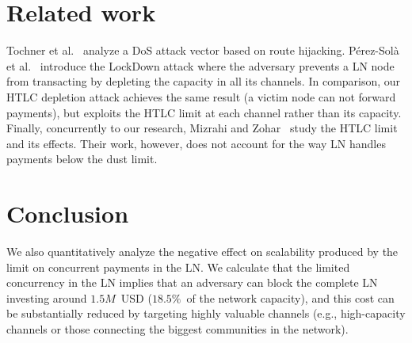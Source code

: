 \section{Related work}

Tochner et al.~\cite{Tochner2019} analyze a DoS attack vector based on route hijacking. 
P{\'{e}}rez{-}Sol{\`{a}} et al.~\cite{PerezSola2019} introduce the LockDown attack where the adversary 
prevents a LN node from transacting by depleting the capacity in all its channels.
In comparison, our HTLC depletion attack achieves the same result (a victim node can not forward payments), but exploits the HTLC limit at each channel rather than its capacity.
Finally, concurrently to our research, Mizrahi and Zohar~\cite{Mizrahi2020} study the HTLC limit and its effects.
Their work, however, does not account for the way LN handles payments below the dust limit.

\section{Conclusion}

We also quantitatively analyze the negative effect on scalability produced by the limit on concurrent payments in the LN. 
We calculate that the limited concurrency in the LN implies that an adversary can block the complete LN investing around $1.5M$~USD ($18.5\%$~of the network capacity), and this cost can be substantially reduced by targeting highly valuable channels (e.g., high-capacity channels or those connecting the biggest communities in the network).